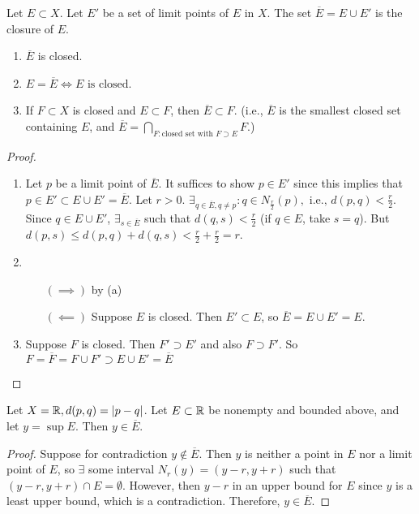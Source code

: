 \begin{definition}[Closure]
	Let $E \subset X$. Let $E'$ be a set of limit points of $E$ in $X$.
	The set $\overline{E}=E \cup E'$ is the closure of $E$.
\end{definition}
\begin{theorem}
	\label{thm:closure}
	\hfill
	\begin{enumerate}
		\item  $\overline{E}$ is closed.
		\item $E=\overline{E} \Leftrightarrow   \text{$E$ is closed}$.
		\item If $F \subset X$ is closed and $E \subset  F$, then $\overline{E} \subset F$. (i.e., $\overline{E}$ is the smallest closed set containing $E$, and $\overline{E}= \bigcap_{F:\text{closed set with $F \supset E$}} F$.)
	\end{enumerate}
	\begin{proof}
		\begin{enumerate}
			\item Let $p$ be a limit point of $\overline{E}$. It suffices to show $p \in E'$ since this implies that $p \in E' \subset E \cup E'=\overline{E}$.
			      Let $r>0$. $\exists_{q\in \overline{E}, q\neq p}: q \in N_{\frac{r}{2}}(p), \text{ i.e., } d(p,q) < \frac{r}{2}$. Since $q \in E \cup E'$, $\exists_{s \in \overline{E}}$ such that $d(q,s)<\frac{r}{2}$ (if $q \in E$, take $s=q$).
			      But $d(p,s) \le d(p,q)+d(q,s)<\frac{r}{2}+\frac{r}{2}=r$.
			\item
			      \begin{itemize}
				      \item[$(\implies)$] by (a)
				      \item[$(\impliedby)$] Suppose $E$ is closed. Then $E' \subset E$, so $\overline{E}=E \cup E'=E$.
			      \end{itemize}
			\item Suppose $F$ is closed. Then $F' \supset E'$ and also $F \supset F'$. So $F=\overline{F}=F \cup F' \supset E \cup E'=\overline{E}$
		\end{enumerate}

	\end{proof}
\end{theorem}

\begin{example}
	Let $X=\mathbb{R} , d(p,q)=|p-q|$. Let $E \subset \mathbb{R} $ be nonempty and bounded above, and let $y=\sup E$. Then $y \in \overline{E}$.
	\begin{proof}
		Suppose for contradiction $y \not\in \overline{E}$. Then $y$ is neither a point in $E$ nor a limit point of $E$, so $\exists$ some interval $N_r(y)=(y-r,y+r)$ such that $(y-r,y+r) \cap  E=\emptyset $. However, then $y-r$ in an upper bound for $E$ since $y$ is a least upper bound, which is a contradiction. Therefore, $y \in \overline{E}$.
	\end{proof}
\end{example}

